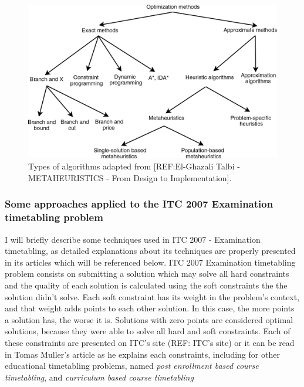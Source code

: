 \begin{figure}[h!]
 \centering
   \includegraphics{./images/types_of_algorithms.png}
   \caption{Types of algorithms adapted from [REF:El-Ghazali Talbi - METAHEURISTICS - From Design to Implementation].}
   \label{fig:TypesAlgorithms}
\end{figure}


\subsubsection{Some approaches applied to the ITC 2007 Examination timetabling problem}
\label{subsection:ApprITC2007}

I will briefly describe some techniques used in ITC 2007 - Examination timetabling, as detailed explanations about its techniques are properly presented in its articles which will be referenced below. ITC 2007 Examination timetabling problem consists on submitting a solution which may solve all hard constraints and the quality of each solution is calculated using the soft constraints the the solution didn't solve. Each soft constraint has its weight in the problem's context, and that weight adds points to each other solution. In this case, the more points a solution has, the worse it is. Solutions with zero points are considered optimal solutions, because they were able to solve all hard and soft constraints. Each of these constraints are presented on ITC's site (REF: ITC's site) or it can be read in Tomas Muller's article as he explains each constraints, including for other educational timetabling problems, named \textit{post enrollment based course timetabling}, and \textit{curriculum based course timetabling}\\
\\

